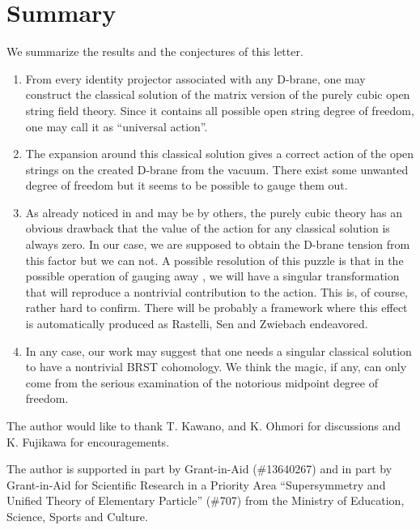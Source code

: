 \documentclass[a4paper,12pt]{article}
\begin{document}
\section{Summary}
We summarize the results and the conjectures of this letter.
\begin{enumerate}
 \item From every identity projector associated with any D-brane,
one may construct the classical solution of 
the matrix version of the purely cubic open string field theory.
Since it contains all possible open string degree of freedom, 
one may call it as ``universal action''.
 \item The expansion around this classical solution gives a correct
action of the open strings on the created D-brane from the vacuum.
There exist some unwanted degree of freedom but it seems to be
possible to gauge them out.
\item As already noticed in \cite{r-RSZ1} and may be by others,
the purely cubic theory has an obvious drawback that the value
of the action \coordHE{} for any classical solution \coordHE{}
is always zero.  In our case, we are supposed to obtain the
D-brane tension from this factor but we can not.  
A possible resolution of this puzzle is that in the 
possible operation of
gauging away \coordHE{}, we will have a singular transformation
that will reproduce a nontrivial contribution to the action.
This is, of course, rather hard to confirm.  There will be
probably a framework where this effect is automatically produced
as Rastelli, Sen and Zwiebach endeavored.
\item In any case, our work may suggest that one needs 
a singular classical solution to have a nontrivial 
BRST cohomology. We think the magic, if any,
can only come from the serious examination of
the notorious midpoint degree of freedom.
\end{enumerate}

\vskip 5mm

The author would like to thank T. Kawano, and K. Ohmori for
discussions and K. Fujikawa for encouragements.

The author is supported in part by Grant-in-Aid (\#13640267)
and in part by Grant-in-Aid for Scientific Research
in a Priority Area ``Supersymmetry and Unified Theory of 
Elementary Particle'' (\#707) from the Ministry of Education,
Science, Sports and Culture.
\end{document}
